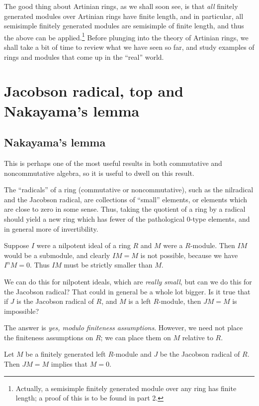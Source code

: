\documentclass[a4paper]{amsart}
\begin{document}
The good thing about Artinian rings, as we shall soon see, is that
{\em all} finitely generated modules over Artinian rings have finite
length, and in particular, all semisimple finitely generated modules
are semisimple of finite length, and thus the above can be
applied.\footnote{Actually, a semisimple finitely generated module
  over any ring has finite length; a proof of this is to be found in
  part 2.} Before plunging into the theory of Artinian rings, we shall
take a bit of time to review what we have seen so far, and study
examples of rings and modules that come up in the ``real'' world.



\section{Jacobson radical, top and Nakayama's lemma}

\subsection{Nakayama's lemma}

This is perhaps one of the most useful results in both commutative and
noncommutative algebra, so it is useful to dwell on this result.

The ``radicals'' of a ring (commutative or noncommutative), such as
the nilradical and the Jacobson radical, are collections of ``small''
elements, or elements which are close to zero in some sense. Thus,
taking the quotient of a ring by a radical should yield a new ring
which has fewer of the pathological $0$-type elements, and in general
more of invertibility.

Suppose $I$ were a nilpotent ideal of a ring $R$ and $M$ were a
$R$-module. Then $IM$ would be a submodule, and clearly $IM = M$ is
not possible, because we have $I^nM = 0$. Thus $IM$ must be strictly
smaller than $M$.

We can do this for nilpotent ideals, which are {\em really small}, but
can we do this for the Jacobson radical? That could in general be a
whole lot bigger. Is it true that if $J$ is the Jacobson radical of
$R$, and $M$ is a left $R$-module, then $JM = M$ is impossible?

The answer is {\em yes, modulo finiteness assumptions}. However, we
need not place the finiteness assumptions on $R$; we can place them on
$M$ relative to $R$.

\begin{theorem}
  Let $M$ be a finitely generated left $R$-module and $J$ be the
  Jacobson radical of $R$. Then $JM = M$ implies that $M = 0$.
\end{theorem}
\end{document}
